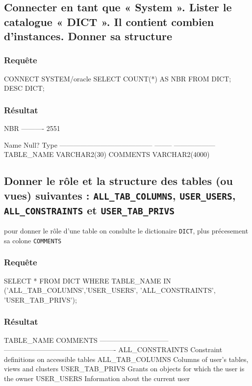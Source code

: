 \documentclass[•]{article}
\begin{document}
\def\reportnumber{3}
\def\reporttitle{Dictionnaire Oracle}


\subsection{Connecter en tant que « System ». Lister le catalogue « DICT ». Il contient combien d’instances. Donner sa
structure}

\subsubsection{Requête}
\begin{sql}
CONNECT SYSTEM/oracle
SELECT COUNT(*) AS NBR FROM DICT;
DESC DICT;

\end{sql}
\subsubsection{Résultat}
\begin{sql}
       NBR
----------
      2551

Name                                      Null?    Type
----------------------------------------- -------- ------------------
TABLE_NAME                                         VARCHAR2(30)
COMMENTS                                           VARCHAR2(4000)
\end{sql}


\subsection{Donner le rôle et la structure des tables (ou vues) suivantes : \texttt{ALL\_TAB\_COLUMNS},
\texttt{USER\_USERS}, \texttt{ALL\_CONSTRAINTS} et \texttt{USER\_TAB\_PRIVS}}
pour donner le rôle d'une table on conslulte le dictionaire \texttt{DICT}, plus précesement sa colone \texttt{COMMENTS}
\subsubsection{Requête}
\begin{sql}
SELECT * FROM DICT 
WHERE TABLE\_NAME IN ('ALL\_TAB\_COLUMNS','USER\_USERS', 'ALL\_CONSTRAINTS', 'USER\_TAB\_PRIVS');
\end{sql}
\subsubsection{Résultat}
\begin{sql}
TABLE_NAME		       COMMENTS
------------------------------ -------------------------------------------------
ALL_CONSTRAINTS 	       Constraint definitions on accessible tables
ALL_TAB_COLUMNS 	       Columns of user's tables, views and clusters
USER_TAB_PRIVS		       Grants on objects for which the user is the owner
USER_USERS		       	   Information about the current user
\end{sql}
\end{document}
